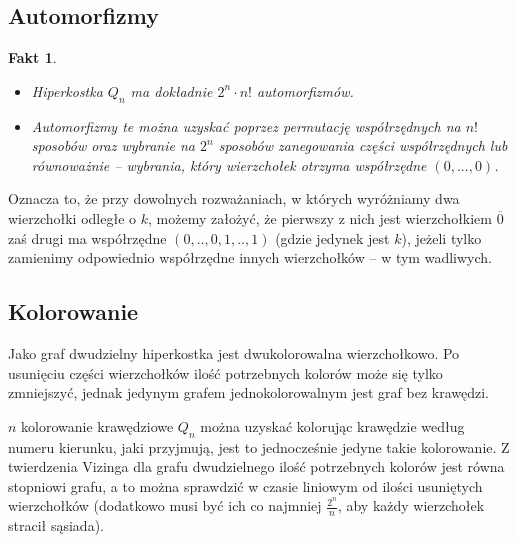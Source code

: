 \documentclass{pracamgr}
\newtheorem{fact}[theorem]{Fakt}
\begin{document}
   \subsection{Automorfizmy}
    \begin{fact}$ $\\
    \vspace{-20pt}
     \begin{itemize}
      \item Hiperkostka $Q_n$ ma dokładnie $2^n\cdot n!$ automorfizmów.
      \item Automorfizmy te można uzyskać poprzez permutację współrzędnych na $n!$ sposobów oraz wybranie na $2^n$ sposobów
       zanegowania części współrzędnych lub równoważnie -- wybrania, który wierzchołek otrzyma współrzędne $(0,...,0)$.
     \end{itemize}
    \end{fact}
    Oznacza to, że przy dowolnych rozważaniach, w których wyróżniamy dwa wierzchołki odległe o $k$, możemy założyć, że pierwszy z nich jest wierzchołkiem $\overline{0}$
    zaś drugi ma współrzędne $(0,..,0,1,..,1)$ (gdzie jedynek jest $k$), jeżeli tylko zamienimy odpowiednio współrzędne innych wierzchołków -- w tym wadliwych.
   \subsection{Kolorowanie}
   
    Jako graf dwudzielny hiperkostka jest dwukolorowalna wierzchołkowo. Po usunięciu części wierzchołków ilość potrzebnych kolorów może się tylko zmniejszyć,
    jednak jedynym grafem jednokolorowalnym jest graf bez krawędzi.
 
    $n$ kolorowanie krawędziowe $Q_n$ można uzyskać kolorując krawędzie według numeru kierunku, jaki przyjmują, jest to jednocześnie jedyne takie kolorowanie.
    Z twierdzenia Vizinga dla grafu dwudzielnego ilość potrzebnych kolorów jest równa stopniowi grafu, a to można sprawdzić w czasie liniowym od ilości
    usuniętych wierzchołków (dodatkowo musi być ich co najmniej $\frac{2^n}{n}$, aby każdy wierzchołek stracił sąsiada).
\end{document}
